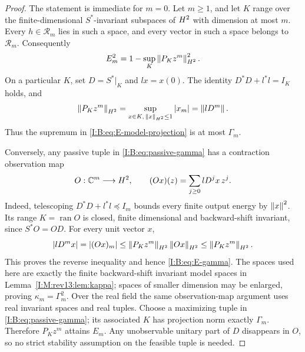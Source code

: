 \begin{proof}
The statement is immediate for $m=0$. Let $m\ge1$, and let $K$ range over
the finite-dimensional $S^*$-invariant subspaces of $H^2$ with dimension
at most $m$. Every $h\in\mathcal R_m$ lies in such a space, and every
vector in such a space belongs to $\mathcal R_m$. Consequently
\begin{equation}
 E_m^2=1-\sup_K\left\lVert P_Kz^m\right\rVert_{H^2}^2.
 \label{I:B:eq:E-model-projection}
\end{equation}
On a particular $K$, set $D=S^*|_K$ and $lx=x(0)$. The identity
$D^*D+l^*l=I_K$ holds, and
\[
 \left\lVert P_Kz^m\right\rVert_{H^2}
   =\sup_{x\in K,\,\left\lVert x\right\rVert_{H^2}\le1}|x_m|
   =\left\lVert lD^m\right\rVert.
\]
Thus the supremum in \eqref{I:B:eq:E-model-projection} is at most $\Gamma_m$.

Conversely, any passive tuple in \eqref{I:B:eq:passive-gamma} has a contraction
observation map
\[
 O:\mathbb C^m\longrightarrow H^2,\qquad
 (Ox)(z)=\sum_{j\ge0}lD^jx\,z^j.
\]
Indeed, telescoping $D^*D+l^*l\preceq I_m$ bounds every finite output
energy by $\left\lVert x\right\rVert^2$. Its range $K=\operatorname{ran}O$ is closed,
finite dimensional and backward-shift invariant, since $S^*O=OD$.
For every unit vector $x$,
\[
 |lD^mx|=|(Ox)_m|
 \le\left\lVert P_Kz^m\right\rVert_{H^2}\left\lVert Ox\right\rVert_{H^2}
 \le\left\lVert P_Kz^m\right\rVert_{H^2}.
\]
This proves the reverse inequality and hence \eqref{I:B:eq:E-gamma}. The spaces used here are exactly the finite backward-shift invariant model spaces in Lemma~\ref{I:M:rev13:lem:kappa}; spaces of smaller dimension may be enlarged, proving $\kappa_m=\Gamma_m^2$. Over the real field the same observation-map argument uses real invariant spaces and real tuples.
Choose a maximizing tuple in \eqref{I:B:eq:passive-gamma}; its associated
$K$ has projection norm exactly $\Gamma_m$. Therefore $P_Kz^m$ attains
$E_m$. Any unobservable unitary part of $D$ disappears in $O$, so no strict
stability assumption on the feasible tuple is needed.
\end{proof}
